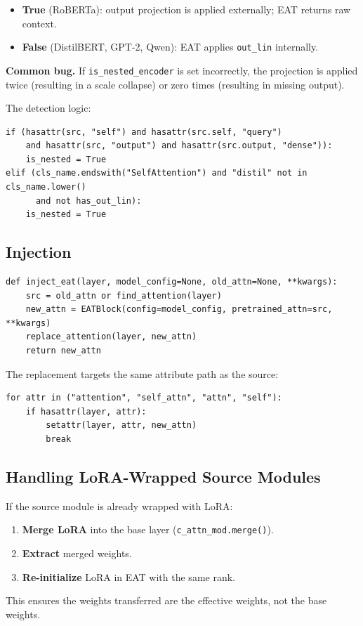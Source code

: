 \begin{itemize}
\item \textbf{True} (RoBERTa): output projection is applied externally; EAT returns
  raw context.
\item \textbf{False} (DistilBERT, GPT-2, Qwen): EAT applies \texttt{out\_lin} internally.

\end{itemize}
\textbf{Common bug.} If \texttt{is\_nested\_encoder} is set incorrectly, the projection 
is applied twice (resulting in a scale collapse) or zero times (resulting 
in missing output).

The detection logic:

\begin{lstlisting}
if (hasattr(src, "self") and hasattr(src.self, "query")
    and hasattr(src, "output") and hasattr(src.output, "dense")):
    is_nested = True
elif (cls_name.endswith("SelfAttention") and "distil" not in cls_name.lower()
      and not has_out_lin):
    is_nested = True
\end{lstlisting}

\subsection{Injection}

\begin{lstlisting}
def inject_eat(layer, model_config=None, old_attn=None, **kwargs):
    src = old_attn or find_attention(layer)
    new_attn = EATBlock(config=model_config, pretrained_attn=src, **kwargs)
    replace_attention(layer, new_attn)
    return new_attn
\end{lstlisting}

The replacement targets the same attribute path as the source:

\begin{lstlisting}
for attr in ("attention", "self_attn", "attn", "self"):
    if hasattr(layer, attr):
        setattr(layer, attr, new_attn)
        break
\end{lstlisting}

\subsection{Handling LoRA-Wrapped Source Modules}

If the source module is already wrapped with LoRA:

\begin{enumerate}
\item \textbf{Merge LoRA} into the base layer (\texttt{c\_attn\_mod.merge()}).
\item \textbf{Extract} merged weights.
\item \textbf{Re-initialize} LoRA in EAT with the same rank.

\end{enumerate}
This ensures the weights transferred are the effective weights, not the 
base weights.

